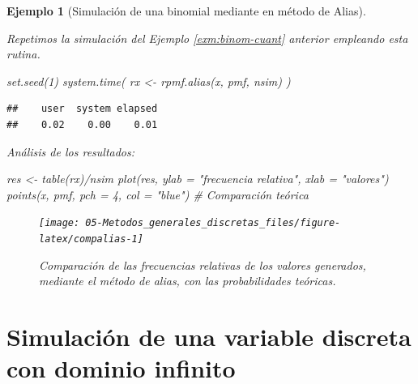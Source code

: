 \documentclass[
]{book}
\newenvironment{Shaded}{\begin{snugshade}}{\end{snugshade}}
\newcommand{\AttributeTok}[1]{\textcolor[rgb]{0.77,0.63,0.00}{#1}}
\newcommand{\CommentTok}[1]{\textcolor[rgb]{0.56,0.35,0.01}{\textit{#1}}}
\newcommand{\DecValTok}[1]{\textcolor[rgb]{0.00,0.00,0.81}{#1}}
\newcommand{\FunctionTok}[1]{\textcolor[rgb]{0.00,0.00,0.00}{#1}}
\newcommand{\NormalTok}[1]{#1}
\newcommand{\OtherTok}[1]{\textcolor[rgb]{0.56,0.35,0.01}{#1}}
\newcommand{\SpecialCharTok}[1]{\textcolor[rgb]{0.00,0.00,0.00}{#1}}
\newcommand{\StringTok}[1]{\textcolor[rgb]{0.31,0.60,0.02}{#1}}
\theoremstyle{break}
\newtheorem{example}{Ejemplo}[chapter]
\theoremstyle{nonumberplain}
\begin{document}
\begin{example}[Simulación de una binomial mediante en método de Alias]
\protect\hypertarget{exm:binom-alias}{}\label{exm:binom-alias}

Repetimos la simulación del Ejemplo \ref{exm:binom-cuant} anterior empleando esta rutina.

\begin{Shaded}
\begin{Highlighting}[]
\FunctionTok{set.seed}\NormalTok{(}\DecValTok{1}\NormalTok{)}
\FunctionTok{system.time}\NormalTok{( rx }\OtherTok{\textless{}{-}} \FunctionTok{rpmf.alias}\NormalTok{(x, pmf, nsim) )}
\end{Highlighting}
\end{Shaded}

\begin{verbatim}
##    user  system elapsed 
##    0.02    0.00    0.01
\end{verbatim}

Análisis de los resultados:

\begin{Shaded}
\begin{Highlighting}[]
\NormalTok{res }\OtherTok{\textless{}{-}} \FunctionTok{table}\NormalTok{(rx)}\SpecialCharTok{/}\NormalTok{nsim}
\FunctionTok{plot}\NormalTok{(res, }\AttributeTok{ylab =} \StringTok{"frecuencia relativa"}\NormalTok{, }\AttributeTok{xlab =} \StringTok{"valores"}\NormalTok{)}
\FunctionTok{points}\NormalTok{(x, pmf, }\AttributeTok{pch =} \DecValTok{4}\NormalTok{, }\AttributeTok{col =} \StringTok{"blue"}\NormalTok{)  }\CommentTok{\# Comparación teórica}
\end{Highlighting}
\end{Shaded}

\begin{figure}[!htb]

{\centering \texttt{[image: 05-Metodos\_generales\_discretas\_files/figure-latex/compalias-1]} 

}

\caption{Comparación de las frecuencias relativas de los valores generados, mediante el método de alias, con las probabilidades teóricas.}\label{fig:compalias}
\end{figure}

\end{example}

\hypertarget{simulaciuxf3n-de-una-variable-discreta-con-dominio-infinito}{%
\section{Simulación de una variable discreta con dominio infinito}\label{simulaciuxf3n-de-una-variable-discreta-con-dominio-infinito}}
\end{document}
